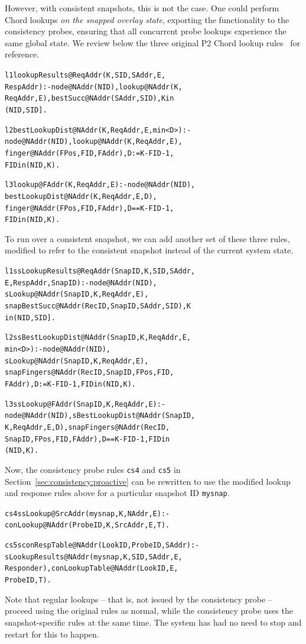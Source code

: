 \documentclass{sig-alt-full}
\def\Sys{P2\xspace}
\newenvironment{overlog}{\begin{alltt}\footnotesize}{\end{alltt}}
\newcommand{\ol}[1]{{\tt\footnotesize#1}}
\begin{document}
However, with consistent snapshots, this is not the case.  One could
perform Chord lookups \emph{on the snapped overlay state}, exporting the
functionality to the consistency probes, ensuring that all concurrent
probe lookups experience the same global state.  We review below the
three original \Sys Chord lookup rules~\cite{Loo2005SOSP} for reference.
\begin{overlog}
l1 lookupResults@ReqAddr(K, SID, SAddr, E,
   RespAddr) :- node@NAddr(NID), lookup@NAddr(K,
   ReqAddr, E), bestSucc@NAddr(SAddr, SID), K in
   (NID, SID].

l2 bestLookupDist@NAddr(K, ReqAddr, E, min<D>) :-
   node@NAddr(NID), lookup@NAddr(K, ReqAddr, E),
   finger@NAddr(FPos, FID, FAddr), D := K-FID-1,
   FID in (NID, K).

l3 lookup@FAddr(K, ReqAddr, E) :- node@NAddr(NID),
   bestLookupDist@NAddr(K, ReqAddr, E, D),
   finger@NAddr(FPos, FID, FAddr), D == K-FID-1,
   FID in (NID, K).
\end{overlog}
To run over a consistent snapshot, we can add another set of these three
rules, modified to refer to the consistent snapshot instead of the current system state.
\begin{overlog}
l1s sLookupResults@ReqAddr(SnapID, K, SID, SAddr,
   E, RespAddr, SnapID) :- node@NAddr(NID),
   sLookup@NAddr(SnapID, K, ReqAddr, E),
   snapBestSucc@NAddr(RecID, SnapID, SAddr, SID), K
   in (NID, SID].

l2s sBestLookupDist@NAddr(SnapID, K, ReqAddr, E,
   min<D>) :- node@NAddr(NID),
   sLookup@NAddr(SnapID, K, ReqAddr, E),
   snapFingers@NAddr(RecID, SnapID, FPos, FID,
   FAddr), D := K-FID-1, FID in (NID, K).

l3s sLookup@FAddr(SnapID, K, ReqAddr, E) :-
   node@NAddr(NID), sBestLookupDist@NAddr(SnapID,
   K,ReqAddr, E, D), snapFingers@NAddr(RecID,
   SnapID, FPos, FID, FAddr), D == K-FID-1, FID in
   (NID, K).
\end{overlog}
Now, the consistency probe rules \ol{cs4} and \ol{cs5}
in Section~\ref{sec:consistency:proactive} can be rewritten
to use the modified lookup and response rules above
for a particular snapshot ID \ol{mysnap}.
\begin{overlog}
cs4s sLookup@SrcAddr(mysnap, K, NAddr, E) :-
   conLookup@NAddr(ProbeID, K, SrcAddr, E, T).

cs5s conRespTable@NAddr(LookID, ProbeID, SAddr) :-
   sLookupResults@NAddr(mysnap, K, SID, SAddr, E,
   Responder), conLookupTable@NAddr(LookID, E,
   ProbeID, T).
\end{overlog}
Note that regular lookups -- that is, not issued by the consistency
probe -- proceed using the original rules as normal, while the
consistency probe uses the snapshot-specific rules at the same time.
The system has had no need to stop and restart for this to happen.
\end{document}
